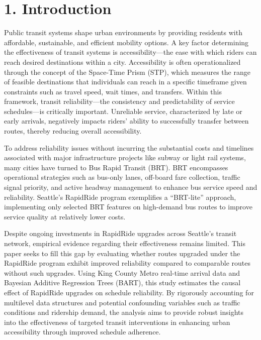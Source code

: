 \documentclass[
  12pt,
]{article}
\begin{document}
\section{1. Introduction}\label{introduction}

Public transit systems shape urban environments by providing residents
with affordable, sustainable, and efficient mobility options. A key
factor determining the effectiveness of transit systems is
accessibility---the ease with which riders can reach desired
destinations within a city. Accessibility is often operationalized
through the concept of the Space-Time Prism (STP), which measures the
range of feasible destinations that individuals can reach in a specific
timeframe given constraints such as travel speed, wait times, and
transfers. Within this framework, transit reliability---the consistency
and predictability of service schedules---is critically important.
Unreliable service, characterized by late or early arrivals, negatively
impacts riders' ability to successfully transfer between routes, thereby
reducing overall accessibility.

To address reliability issues without incurring the substantial costs
and timelines associated with major infrastructure projects like subway
or light rail systems, many cities have turned to Bus Rapid Transit
(BRT). BRT encompasses operational strategies such as bus-only lanes,
off-board fare collection, traffic signal priority, and active headway
management to enhance bus service speed and reliability. Seattle's
RapidRide program exemplifies a ``BRT-lite'' approach, implementing only
selected BRT features on high-demand bus routes to improve service
quality at relatively lower costs.

Despite ongoing investments in RapidRide upgrades across Seattle's
transit network, empirical evidence regarding their effectiveness
remains limited. This paper seeks to fill this gap by evaluating whether
routes upgraded under the RapidRide program exhibit improved reliability
compared to comparable routes without such upgrades. Using King County
Metro real-time arrival data and Bayesian Additive Regression Trees
(BART), this study estimates the causal effect of RapidRide upgrades on
schedule reliability. By rigorously accounting for multilevel data
structures and potential confounding variables such as traffic
conditions and ridership demand, the analysis aims to provide robust
insights into the effectiveness of targeted transit interventions in
enhancing urban accessibility through improved schedule adherence.
\end{document}
